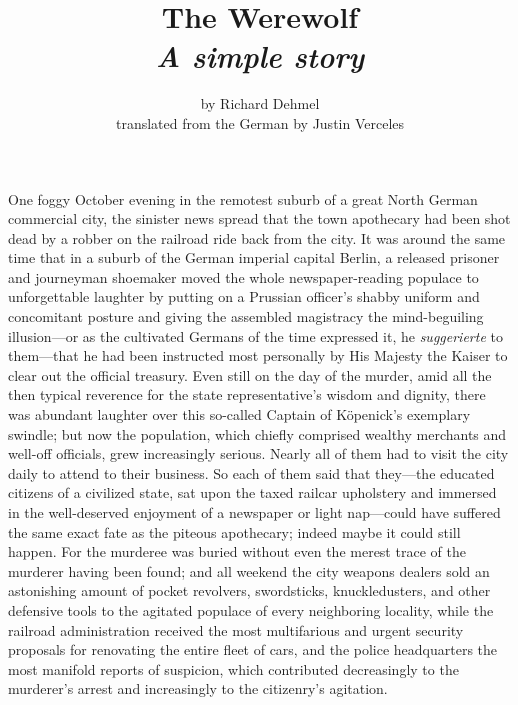 \documentclass[12pt,a4paper]{article}
\title{The Werewolf\\ \large{\textit{A simple story}}}
\author{by Richard Dehmel\\translated from the German by Justin Verceles}
\date{}
\begin{document}
\maketitle

One foggy October evening in the remotest suburb of a great North German commercial city, the sinister news spread that the town apothecary had been shot dead by a robber on the railroad ride back from the city. It was around the same time that in a suburb of the German imperial capital Berlin, a released prisoner and journeyman shoemaker moved the whole newspaper-reading populace to unforgettable laughter by putting on a Prussian officer’s shabby uniform and concomitant posture and giving the assembled magistracy the mind-beguiling illusion—or as the cultivated Germans of the time expressed it, he \textit{suggerierte} to them—that he had been instructed most personally by His Majesty the Kaiser to clear out the official treasury. Even still on the day of the murder, amid all the then typical reverence for the state representative’s wisdom and dignity, there was abundant laughter over this so-called Captain of Köpenick’s exemplary swindle; but now the population, which chiefly comprised wealthy merchants and well-off officials, grew increasingly serious. Nearly all of them had to visit the city daily to attend to their business. So each of them said that they—the educated citizens of a civilized state, sat upon the taxed railcar upholstery and immersed in the well-deserved enjoyment of a newspaper or light nap—could have suffered the same exact fate as the piteous apothecary; indeed maybe it could still happen. For the murderee was buried without even the merest trace of the murderer having been found; and all weekend the city weapons dealers sold an astonishing amount of pocket revolvers, swordsticks, knuckledusters, and other defensive tools to the agitated populace of every neighboring locality, while the railroad administration received the most multifarious and urgent security proposals for renovating the entire fleet of cars, and the police headquarters the most manifold reports of suspicion, which contributed decreasingly to the murderer’s arrest and increasingly to the citizenry’s agitation.
\end{document}
